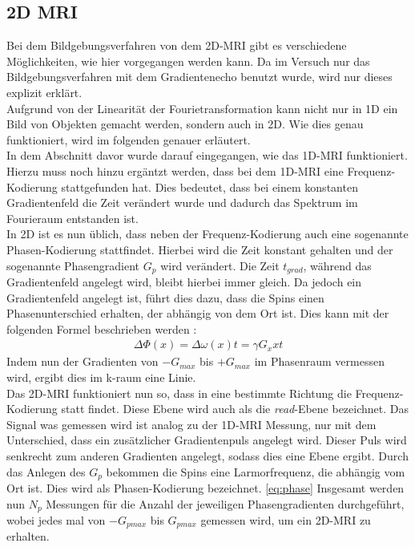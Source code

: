 \subsection{2D MRI}
Bei dem Bildgebungsverfahren von dem 2D-MRI gibt es verschiedene Möglichkeiten, wie hier vorgegangen werden kann. Da im Versuch nur das Bildgebungsverfahren mit dem Gradientenecho benutzt wurde, wird nur dieses explizit erklärt.\\
Aufgrund von der Linearität der Fourietransformation kann nicht nur in 1D ein Bild von Objekten gemacht werden, sondern auch in 2D. Wie dies genau funktioniert, wird im folgenden genauer erläutert.\\
In dem Abschnitt davor wurde darauf eingegangen, wie das 1D-MRI funktioniert. Hierzu muss noch hinzu ergäntzt werden, dass bei dem 1D-MRI eine Frequenz-Kodierung stattgefunden hat. Dies bedeutet, dass bei einem konstanten Gradientenfeld die Zeit verändert wurde und dadurch das Spektrum im Fourieraum entstanden ist. \\
In 2D ist es nun üblich, dass neben der Frequenz-Kodierung auch eine sogenannte Phasen-Kodierung stattfindet. Hierbei wird die Zeit konstant gehalten und der sogenannte Phasengradient $G_p$ wird verändert. Die Zeit $t_{grad}$, während das Gradientenfeld angelegt wird, bleibt hierbei immer gleich. Da jedoch ein Gradientenfeld angelegt ist, führt dies dazu, dass die Spins einen Phasenunterschied erhalten, der abhängig von dem Ort ist. Dies kann mit der folgenden Formel beschrieben werden \cite{Schmidt}:
\begin{align}
    \Delta\Phi(x)= \Delta\omega(x)t=\gamma G_xxt
\end{align}\label{eq:phase}
Indem nun der Gradienten von $-G_{max}$ bis $+G_{max}$ im Phasenraum vermessen wird, ergibt dies im k-raum eine Linie.\\
Das 2D-MRI funktioniert nun so, dass in eine bestimmte Richtung die Frequenz-Kodierung statt findet. Diese Ebene wird auch als die \textit{read}-Ebene bezeichnet. Das Signal was gemessen wird ist analog zu der 1D-MRI Messung, nur mit dem Unterschied, dass ein zusätzlicher Gradientenpuls angelegt wird. Dieser Puls wird senkrecht zum anderen Gradienten angelegt, sodass dies eine Ebene ergibt. Durch das Anlegen des $G_p$ bekommen die Spins eine Larmorfrequenz, die abhängig vom Ort ist. Dies wird als Phasen-Kodierung bezeichnet. \ref{eq:phase}
Insgesamt werden nun $N_p$ Messungen für die Anzahl der jeweiligen Phasengradienten durchgeführt, wobei jedes mal von $-G_{pmax}$ bis $G_{pmax}$ gemessen wird, um ein 2D-MRI zu erhalten.
